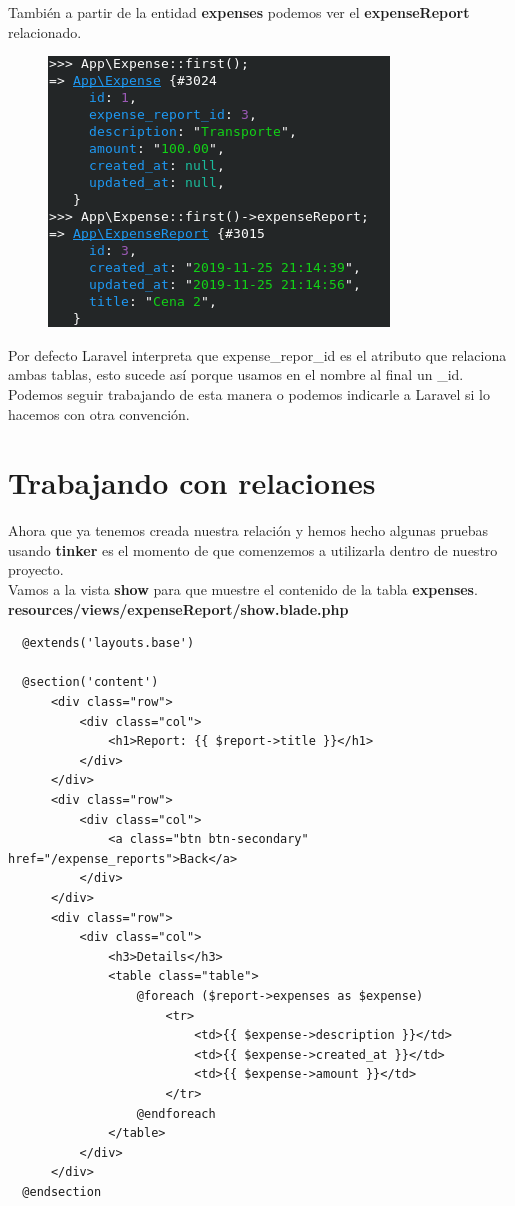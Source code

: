 \documentclass{article}
\begin{document}
También a partir de la entidad \textbf{expenses} podemos ver el
\textbf{expenseReport} relacionado.

\begin{figure}[h!]
  \centering
  \includegraphics[scale=0.75]{./Pictures/109_expenses_ok.png}
\end{figure}

Por defecto Laravel interpreta que expense\_repor\_id es el atributo que
relaciona ambas tablas, esto sucede así porque usamos en el nombre al final un
\_id. Podemos seguir trabajando de esta manera o podemos indicarle a Laravel si
lo hacemos con otra convención.\\

\newpage




\section{Trabajando con relaciones}%
Ahora que ya tenemos creada nuestra relación y hemos hecho algunas pruebas
usando \textbf{tinker} es el momento de que comenzemos a utilizarla dentro de
nuestro proyecto.\\

Vamos a la vista \textbf{show} para que muestre el contenido de la tabla
\textbf{expenses}.\\

\textbf{resources/views/expenseReport/show.blade.php}
\begin{verbatim}
  @extends('layouts.base')

  @section('content')
      <div class="row">
          <div class="col">
              <h1>Report: {{ $report->title }}</h1>
          </div>
      </div>
      <div class="row">
          <div class="col">
              <a class="btn btn-secondary" href="/expense_reports">Back</a>
          </div>
      </div>
      <div class="row">
          <div class="col">
              <h3>Details</h3>
              <table class="table">
                  @foreach ($report->expenses as $expense)
                      <tr>
                          <td>{{ $expense->description }}</td>
                          <td>{{ $expense->created_at }}</td>
                          <td>{{ $expense->amount }}</td>
                      </tr>
                  @endforeach
              </table>
          </div>
      </div>
  @endsection
\end{verbatim}
\end{document}
